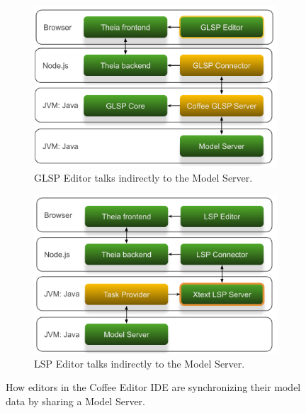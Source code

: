 \begin{figure}[!htb]
    \centering
    \begin{subfigure}[b]{.45\textwidth}
        \centering
        \includegraphics[width=\textwidth]{figures/coffee-maker-glsp}
        \caption{\Gls{GLSP} Editor talks indirectly to the Model Server.~\cite[p.~17]{philiplangerWebbasedModelingTools2020}}\label{sfig:coffee-example-glsp}
    \end{subfigure}
    \hfill
    \begin{subfigure}[b]{.45\textwidth}
        \centering
        \includegraphics[width=\textwidth]{figures/coffee-maker-Xtext-LSP}
        \caption{\Gls{LSP} Editor talks indirectly to the Model Server.~\cite[p.~23]{philiplangerWebbasedModelingTools2020}}\label{sfig:coffee-example-lsp}
    \end{subfigure}
    \caption{How editors in the Coffee Editor IDE are synchronizing their model data by sharing a Model Server.}\label{fig:coffee-example-servers}
\end{figure}

